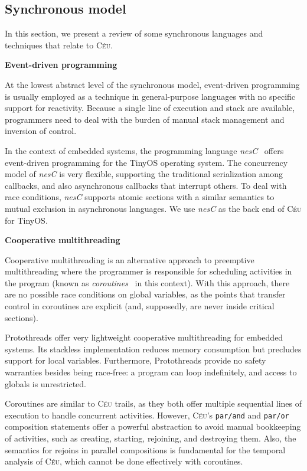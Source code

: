 \documentclass{sigplan-proc}
\newcommand{\2}{\;\;}
\newcommand{\5}{\;\;\;\;\;}
\newcommand{\CEU}{\textsc{C\'{e}u}}
\newcommand{\nesc}{\emph{nesC}}
\newcommand{\code}[1] {{\small{\texttt{#1}}}}
\begin{document}
\subsection{Synchronous model}

In this section, we present a review of some synchronous languages and 
techniques that relate to \CEU.

\textbf{Event-driven programming}

At the lowest abstract level of the synchronous model, event-driven programming 
is usually employed as a technique in general-purpose languages with no 
specific support for reactivity.
Because a single line of execution and stack are available, programmers need to 
deal with the burden of manual stack management and inversion of 
control.~\cite{sync_async.cooperative}

In the context of embedded systems, the programming language 
\nesc{}~\cite{wsn.nesc} offers event-driven programming for the TinyOS 
operating system.
The concurrency model of \nesc{} is very flexible, supporting the traditional 
serialization among callbacks, and also asynchronous callbacks that interrupt 
others.
To deal with race conditions, \nesc{} supports atomic sections with a similar 
semantics to mutual exclusion in asynchronous languages.
We use \nesc{} as the back end of \CEU{} for TinyOS.

\textbf{Cooperative multithreading}

Cooperative multithreading is an alternative approach to preemptive 
multithreading where the programmer is responsible for scheduling activities in 
the program (known as \emph{coroutines}~\cite{lua.coroutines} in this context).
With this approach, there are no possible race conditions on global variables, 
as the points that transfer control in coroutines are explicit (and, 
supposedly, are never inside critical sections).

Protothreads \cite{wsn.protothreads} offer very lightweight cooperative 
multithreading for embedded systems.
Its stackless implementation reduces memory consumption but precludes support 
for local variables.
Furthermore, Protothreads provide no safety warranties besides being race-free: 
a program can loop indefinitely, and access to globals is unrestricted.

Coroutines are similar to \CEU{} trails, as they both offer multiple sequential 
lines of execution to handle concurrent activities.
However, \CEU{}'s \code{par/and} and \code{par/or} composition statements offer 
a powerful abstraction to avoid manual bookkeeping of activities, such as 
creating, starting, rejoining, and destroying them.
Also, the semantics for rejoins in parallel compositions is fundamental for the 
temporal analysis of \CEU{}, which cannot be done effectively with coroutines.
\end{document}
